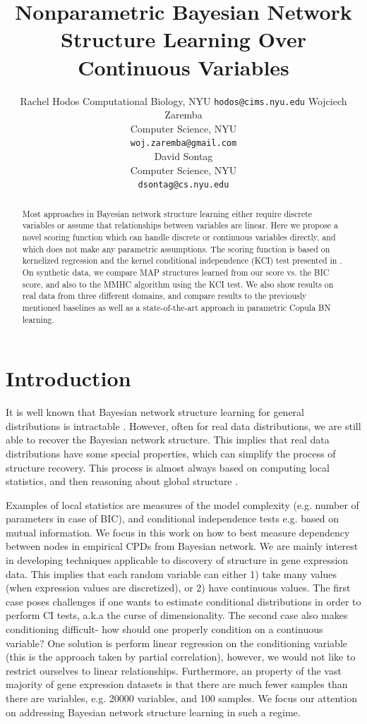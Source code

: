 \documentclass{article} %
\title{Nonparametric Bayesian Network Structure Learning Over Continuous Variables}
\author{
Rachel Hodos
Computational Biology, NYU
\texttt{hodos@cims.nyu.edu}
\Xnd
Wojciech Zaremba \\
Computer Science, NYU \\
\texttt{woj.zaremba@gmail.com} \\
\XND
David Sontag \\
Computer Science, NYU \\
\texttt{dsontag@cs.nyu.edu} \\
}
\begin{document}
\maketitle

\begin{abstract}

Most approaches in Bayesian network structure learning either require discrete variables or assume that relationships between variables are linear.  Here we propose a novel scoring function which can handle discrete or continuous variables directly, and which does not make any parametric assumptions.  The scoring function is based on kernelized regression and the kernel conditional independence (KCI) test presented in \cite{zhang2012kernel}.  On synthetic data, we compare MAP structures learned from our score vs. the BIC score, and also to the MMHC algorithm using the KCI test.  We also show results on real data from three different domains, and compare results to the previously mentioned baselines as well as a state-of-the-art approach in parametric Copula BN learning.

\end{abstract}


\section{Introduction}
It is well known that Bayesian network structure learning for general distributions is intractable \cite{chickering1996learning}. However, often for real data distributions, we are still able to recover the Bayesian network structure. This implies that real data distributions have some special properties, which can simplify the process of structure recovery.  This  process is almost always based on computing local statistics, and then reasoning about global structure \cite{jaakkola2010learning, tsamardinos2006max}. 

Examples of local statistics are measures of the model complexity (e.g. number of parameters in case of BIC\cite{schwarz1978estimating}), and conditional independence tests e.g. based on mutual information.  We focus in this work on how to best measure dependency between nodes in empirical CPDs from Bayesian network. We are mainly interest in developing techniques applicable to discovery of structure in gene expression data. This implies that each random variable can either 1) take many values (when expression values are discretized), or 2) have continuous values. The first case poses challenges if one wants to estimate conditional distributions in order to perform CI tests, a.k.a the curse of dimensionality.  The second case also makes conditioning difficult- how should one properly condition on a continuous variable?  One solution is perform linear regression on the conditioning variable (this is the approach taken by partial correlation), however, we would not like to restrict ourselves to linear relationships.  Furthermore, an property of the vast majority of gene expression datasets is that there are much fewer samples than there are variables, e.g. 20000 variables, and 100 samples.   We focus our attention on addressing Bayesian network structure learning
in such a regime. 
\end{document}
